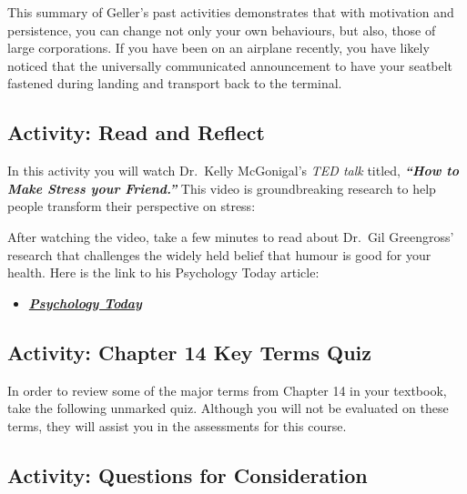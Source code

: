 \documentclass[
]{book}
\providecommand{\tightlist}{%
  \setlength{\itemsep}{0pt}\setlength{\parskip}{0pt}}
\begin{document}
This summary of Geller's past activities demonstrates that with motivation and persistence, you can change not only your own behaviours, but also, those of large corporations. If you have been on an airplane recently, you have likely noticed that the universally communicated announcement to have your seatbelt fastened during landing and transport back to the terminal.

\hypertarget{activity-read-and-reflect-15}{%
\subsection*{Activity: Read and Reflect}\label{activity-read-and-reflect-15}}

\begin{reflect}
In this activity you will watch Dr.~Kelly McGonigal's \emph{TED talk} titled, \textbf{\emph{``How to Make Stress your Friend.''}} This video is groundbreaking research to help people transform their perspective on stress:

After watching the video, take a few minutes to read about Dr.~Gil Greengross' research that challenges the widely held belief that humour is good for your health. Here is the link to his Psychology Today article:

\begin{itemize}
\tightlist
\item
  \href{https://www.psychologytoday.com/intl/blog/humor-sapiens/201805/humor-may-not-be-so-good-your-health}{\textbf{\emph{Psychology Today}}}
\end{itemize}
\end{reflect}

\hypertarget{activity-chapter-14-key-terms-quiz}{%
\subsection*{Activity: Chapter 14 Key Terms Quiz}\label{activity-chapter-14-key-terms-quiz}}

\begin{reflect}
In order to review some of the major terms from Chapter 14 in your textbook, take the following unmarked quiz. Although you will not be evaluated on these terms, they will assist you in the assessments for this course.
\end{reflect}

\hypertarget{activity-questions-for-consideration-14}{%
\subsection*{Activity: Questions for Consideration}\label{activity-questions-for-consideration-14}}
\end{document}
